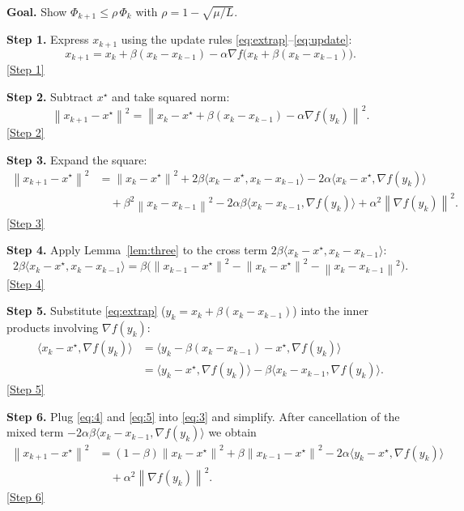 \documentclass{article}
\newcommand{\norm}[1]{\left\lVert#1\right\rVert}
\newcommand{\ip}[2]{\langle #1,#2\rangle}
\newcommand{\grad}{\nabla}
\begin{document}
\noindent\textbf{Goal.} Show $\Phi_{k+1}\le \rho\,\Phi_{k}$ with $\rho=1-\sqrt{\mu/L}$.

\bigskip
\noindent\textbf{Step 1.} Express $x_{k+1}$ using the update rules \eqref{eq:extrap}–\eqref{eq:update}:
\[
x_{k+1}=x_{k}+ \beta (x_{k}-x_{k-1})-\alpha \grad f\!\bigl(x_{k}+ \beta (x_{k}-x_{k-1})\bigr).
\tag{1}
\]
\noindent\underline{[Step 1]}

\medskip
\noindent\textbf{Step 2.} Subtract $x^{\star}$ and take squared norm:
\[
\norm{x_{k+1}-x^{\star}}^{2}
 =\norm{x_{k}-x^{\star}+\beta (x_{k}-x_{k-1})-\alpha \grad f(y_{k})}^{2}.
\tag{2}
\]
\noindent\underline{[Step 2]}

\medskip
\noindent\textbf{Step 3.} Expand the square:
\[
\begin{aligned}
\norm{x_{k+1}-x^{\star}}^{2}
&= \norm{x_{k}-x^{\star}}^{2}
   +2\beta\ip{x_{k}-x^{\star}}{x_{k}-x_{k-1}}
   -2\alpha\ip{x_{k}-x^{\star}}{\grad f(y_{k})}\\
&\quad +\beta^{2}\norm{x_{k}-x_{k-1}}^{2}
   -2\alpha\beta\ip{x_{k}-x_{k-1}}{\grad f(y_{k})}
   +\alpha^{2}\norm{\grad f(y_{k})}^{2}.
\end{aligned}
\tag{3}
\]
\noindent\underline{[Step 3]}

\medskip
\noindent\textbf{Step 4.} Apply Lemma~\ref{lem:three} to the cross term $2\beta\ip{x_{k}-x^{\star}}{x_{k}-x_{k-1}}$:
\[
2\beta\ip{x_{k}-x^{\star}}{x_{k}-x_{k-1}}
 =\beta\bigl(\norm{x_{k-1}-x^{\star}}^{2}-\norm{x_{k}-x^{\star}}^{2}-\norm{x_{k}-x_{k-1}}^{2}\bigr).
\tag{4}
\]
\noindent\underline{[Step 4]}

\medskip
\noindent\textbf{Step 5.} Substitute \eqref{eq:extrap} ($y_{k}=x_{k}+ \beta (x_{k}-x_{k-1})$) into the inner products involving $\grad f(y_{k})$:
\[
\begin{aligned}
\ip{x_{k}-x^{\star}}{\grad f(y_{k})}
   &=\ip{y_{k}-\beta (x_{k}-x_{k-1})-x^{\star}}{\grad f(y_{k})}\\
   &=\ip{y_{k}-x^{\star}}{\grad f(y_{k})}
     -\beta\ip{x_{k}-x_{k-1}}{\grad f(y_{k})}.
\end{aligned}
\tag{5}
\]
\noindent\underline{[Step 5]}

\medskip
\noindent\textbf{Step 6.} Plug \eqref{eq:4} and \eqref{eq:5} into \eqref{eq:3} and simplify. After cancellation of the mixed term $-2\alpha\beta\ip{x_{k}-x_{k-1}}{\grad f(y_{k})}$ we obtain
\[
\begin{aligned}
\norm{x_{k+1}-x^{\star}}^{2}
&= (1-\beta)\norm{x_{k}-x^{\star}}^{2}
   +\beta \norm{x_{k-1}-x^{\star}}^{2}
   -2\alpha\ip{y_{k}-x^{\star}}{\grad f(y_{k})}\\
&\quad +\alpha^{2}\norm{\grad f(y_{k})}^{2}.
\end{aligned}
\tag{6}
\]
\noindent\underline{[Step 6]}
\end{document}
